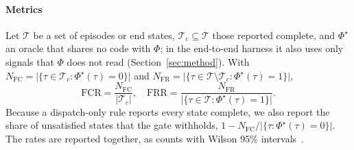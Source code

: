 \paragraph{Metrics} Let $\mathcal{T}$ be a set of episodes or end states, $\mathcal{T}_c\subseteq\mathcal{T}$ those reported complete, and $\Phi^{\star}$ an oracle that shares no code with $\Phi$; in the end-to-end harness it also uses only signals that $\Phi$ does not read (Section~\ref{sec:method}). With $N_{\mathrm{FC}}=\lvert\{\tau\in\mathcal{T}_c:\Phi^{\star}(\tau)=0\}\rvert$ and $N_{\mathrm{FR}}=\lvert\{\tau\in\mathcal{T}\setminus\mathcal{T}_c:\Phi^{\star}(\tau)=1\}\rvert$,
\begin{equation}
\mathrm{FCR} = \frac{N_{\mathrm{FC}}}{\lvert\mathcal{T}_c\rvert}, \quad
\mathrm{FRR} = \frac{N_{\mathrm{FR}}}{\lvert\{\tau\in\mathcal{T}:\Phi^{\star}(\tau)=1\}\rvert}.
\label{eq:fcr}
\end{equation}
Because a dispatch-only rule reports every state complete, we also report the share of unsatisfied states that the gate withholds, $1-N_{\mathrm{FC}}/\lvert\{\tau:\Phi^{\star}(\tau)=0\}\rvert$. The rates are reported together, as counts with Wilson 95\% intervals~\cite{wilson1927probable}.
